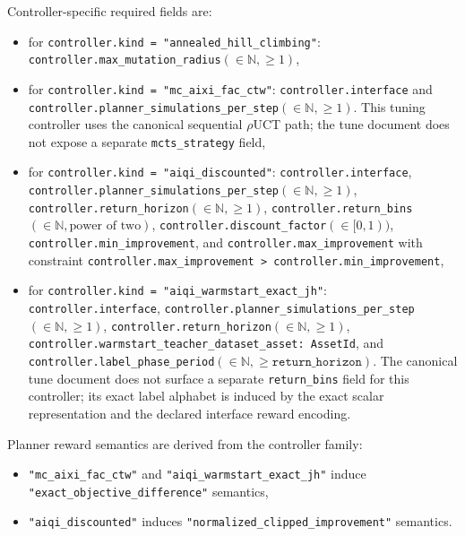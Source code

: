 \documentclass[11pt]{article}
\begin{document}
Controller-specific required fields are:
\begin{itemize}
    \item for \texttt{controller.kind = "annealed\_hill\_climbing"}:
    \texttt{controller.max\_mutation\_radius}\((\in\mathbb{N},\ge 1)\),
    \item for \texttt{controller.kind = "mc\_aixi\_fac\_ctw"}:
    \texttt{controller.interface} and
    \texttt{controller.planner\_simulations\_per\_step}\((\in\mathbb{N},\ge 1)\).
    This tuning controller uses the canonical sequential $\rho$UCT path; the
    tune document does not expose a separate \texttt{mcts\_strategy} field,
    \item for \texttt{controller.kind = "aiqi\_discounted"}:
    \texttt{controller.interface},
    \texttt{controller.planner\_simulations\_per\_step}\((\in\mathbb{N},\ge 1)\),
    \texttt{controller.return\_horizon}\((\in\mathbb{N},\ge 1)\),
    \texttt{controller.return\_bins}\((\in\mathbb{N},\text{power of two})\),
    \texttt{controller.discount\_factor}\((\in[0,1))\),
    \texttt{controller.min\_improvement}, and
    \texttt{controller.max\_improvement} with constraint
    \texttt{controller.max\_improvement > controller.min\_improvement},
    \item for \texttt{controller.kind = "aiqi\_warmstart\_exact\allowbreak\_jh"}:
    \texttt{controller.interface},
    \texttt{controller.planner\_simulations\_per\_step}\((\in\mathbb{N},\ge 1)\),
    \texttt{controller.return\_horizon}\((\in\mathbb{N},\ge 1)\),
    \texttt{controller.warmstart\_teacher\_dataset\_asset: AssetId},
    and
    \texttt{controller.label\_phase\_period}\((\in\mathbb{N},\ge\texttt{return\_horizon})\).
    The canonical tune document does not surface a separate
    \texttt{return\_bins} field for this controller; its exact label alphabet
    is induced by the exact scalar representation and the declared interface
    reward encoding.
\end{itemize}

Planner reward semantics are derived from the controller family:
\begin{itemize}
    \item \texttt{"mc\_aixi\_fac\_ctw"} and
    \texttt{"aiqi\_warmstart\_exact\_jh"} induce
    \texttt{"exact\_objective\_difference"} semantics,
    \item \texttt{"aiqi\_discounted"} induces
    \texttt{"normalized\_clipped\_improvement"} semantics.
\end{itemize}
\end{document}
